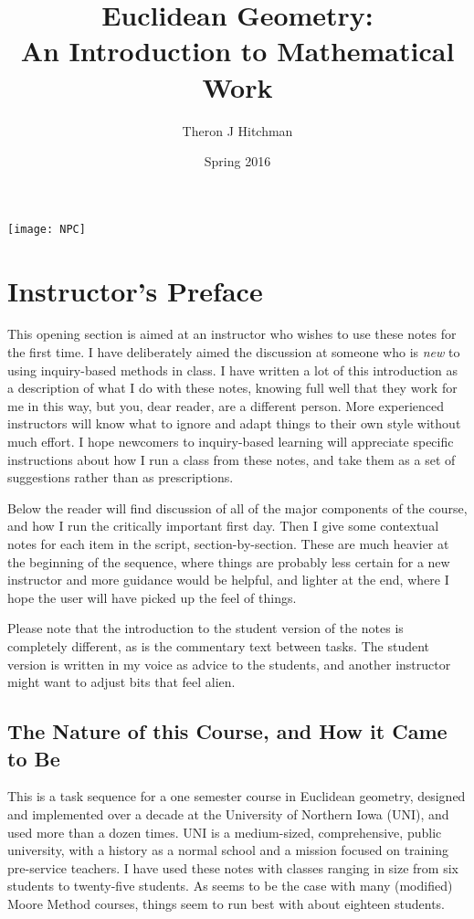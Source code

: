 \documentclass{tufte-handout}
\title{Euclidean Geometry:\\ An Introduction to Mathematical Work}
\author[Hitchman]{Theron J Hitchman}
\date{Spring 2016}
\theoremstyle{definition}
\begin{document}
\maketitle

\begin{marginfigure}
    \texttt{[image: NPC]}
\end{marginfigure}


\setcounter{section}{0}
\setcounter{problem}{0}
\section{Instructor's Preface}

This opening section is aimed at an instructor who wishes to use these notes for the first time.
I have deliberately aimed the discussion at someone who is \emph{new} to using inquiry-based methods in class. I have written a lot of this introduction as a description of what I do with these notes, knowing full well that they work for me in this way, but you, dear reader, are a different person.
More experienced instructors will know what to ignore and adapt things to their own style without much effort.
I hope newcomers to inquiry-based learning will appreciate specific instructions about how I run a class from these notes, and take them as a set of suggestions rather than as prescriptions.

Below the reader will find discussion of all of the major components of the course, and how I run the critically important first day.
Then I give some contextual notes for each item in the script, section-by-section. These are much heavier at the beginning of the sequence, where things are probably less certain for a new instructor and more guidance would be helpful, and lighter at the end, where I hope the user will have picked up the feel of things.

Please note that the introduction to the student version of the notes is completely different, as is the commentary text between tasks. The student version is written in my voice as advice to the students, and another instructor might want to adjust bits that feel alien.

\subsection{The Nature of this Course, and How it Came to Be}

This is a task sequence for a one semester course in Euclidean  geometry, designed and implemented over a decade at the University of Northern Iowa (UNI), and used more than a dozen times. UNI is a medium-sized, comprehensive, public university, with a history as a normal school and a mission focused on training pre-service teachers. 
I have used these notes with classes ranging in size from six students to twenty-five students. As seems to be the case with many (modified) Moore Method courses, things seem to run best with about eighteen students.
\end{document}
